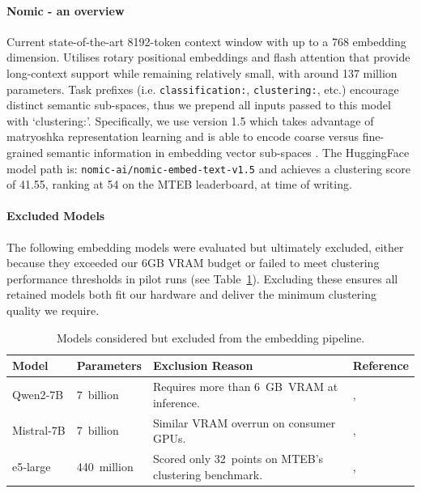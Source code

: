 \documentclass[10pt,oneside]{report}
\renewcommand{\citet}[1]{\citeauthor{#1}, \citeyear{#1}}
\begin{document}
\paragraph{Nomic - an overview}
Current state-of-the-art 8192-token context window with up to a 768 embedding dimension. Utilises rotary positional embeddings and flash attention that provide long-context support while remaining relatively small, with around 137 million parameters. Task prefixes (i.e. \texttt{classification:}, \texttt{clustering:}, etc.) encourage distinct semantic sub-spaces, thus we prepend all inputs passed to this model with `clustering:'. Specifically, we use version 1.5 which takes advantage of matryoshka representation learning and is able to encode coarse versus fine-grained semantic information in embedding vector sub-spaces \cite{nussbaum2024nomic, nussbaum2024nomic1.5}. The HuggingFace model path is: \texttt{nomic-ai/nomic-embed-text-v1.5} and achieves a clustering score of 41.55, ranking at 54 on the MTEB leaderboard, at time of writing.

\paragraph{Excluded Models}
The following embedding models were evaluated but ultimately excluded, either because they exceeded our 6GB VRAM budget or failed to meet clustering performance thresholds in pilot runs (see Table~\ref{tab:excludedModels}). Excluding these ensures all retained models both fit our hardware and deliver the minimum clustering quality we require.

\begin{table}[htbp]
    \fontsize{8}{11}\selectfont
    \centering
    \begin{adjustbox}{max width=\textwidth}
        \begin{tabular}{p{1.6cm} p{1.7cm} p{7.3cm} p{2.3cm}}
        \toprule
        \textbf{Model} & \textbf{Parameters} & \textbf{Exclusion Reason} & \textbf{Reference}\\
        \midrule
        Qwen2‑7B   & 7 billion   & Requires more than 6 GB VRAM at inference. & \citet{yang2407qwen2} \\
        Mistral‑7B & 7 billion   & Similar VRAM overrun on consumer GPUs. & \citet{wang2023improving} \\
        e5‑large   & 440 million & Scored only 32 points on MTEB’s clustering  benchmark. & \citet{wang2024multilingual}\\
        \bottomrule
        \end{tabular}
    \end{adjustbox}
    \caption{Models considered but excluded from the embedding pipeline.}
    \label{tab:excludedModels}
\end{table}
\end{document}
